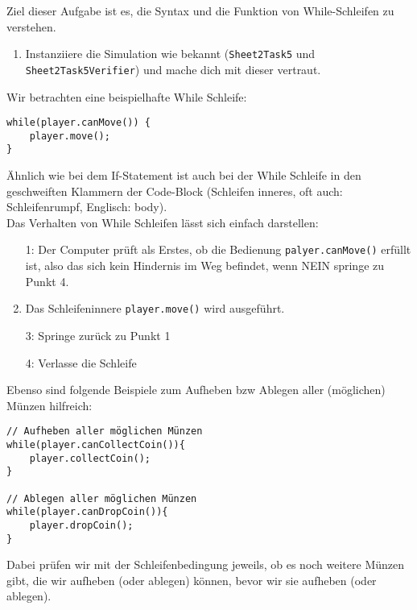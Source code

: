 

Ziel dieser Aufgabe ist es, die Syntax und die Funktion von While-Schleifen zu verstehen.

\begin{enumerate}
    \item Instanziiere die Simulation wie bekannt (\lstinline{Sheet2Task5} und \lstinline{Sheet2Task5Verifier}) und mache dich mit dieser vertraut.
\end{enumerate}


\begin{Infobox}
    Wir betrachten eine beispielhafte While Schleife:

    \begin{lstlisting}[breaklines=true, numbers=none]
while(player.canMove()) {
    player.move();
}
    \end{lstlisting}

    Ähnlich wie bei dem If-Statement ist auch bei der While Schleife in den geschweiften Klammern der Code-Block (Schleifen inneres, oft auch: Schleifenrumpf, Englisch: body).\\

    Das Verhalten von While Schleifen lässt sich einfach darstellen:
    \begin{enumerate}
        \item[1:] Der Computer prüft als Erstes, ob die Bedienung \lstinline{palyer.canMove()} erfüllt ist, also das sich kein Hindernis im Weg befindet, wenn NEIN springe zu Punkt 4.
        \item[2:] Das Schleifeninnere \lstinline{player.move()} wird ausgeführt.
        \item[3:] Springe zurück zu Punkt 1
        \item[4:] Verlasse die Schleife
    \end{enumerate}

    Ebenso sind folgende Beispiele zum Aufheben bzw Ablegen aller (möglichen) Münzen hilfreich:

    \begin{lstlisting}[breaklines=true, numbers=none]
// Aufheben aller möglichen Münzen
while(player.canCollectCoin()){
    player.collectCoin();
}

// Ablegen aller möglichen Münzen
while(player.canDropCoin()){
    player.dropCoin();
}
    \end{lstlisting}

    Dabei prüfen wir mit der Schleifenbedingung jeweils, ob es noch weitere Münzen gibt, die wir aufheben (oder ablegen) können, bevor wir sie aufheben (oder ablegen).
\end{Infobox}


